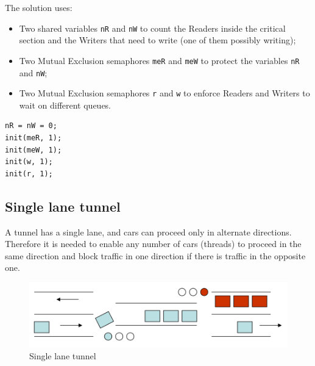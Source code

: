The solution uses:
\begin{itemize}
\item Two shared variables \texttt{nR} and \texttt{nW} to count the Readers inside the critical section and the Writers that need to write (one of them possibly writing);
\item Two Mutual Exclusion semaphores \texttt{meR} and \texttt{meW} to protect the variables \texttt{nR} and \texttt{nW};
\item Two Mutual Exclusion semaphores \texttt{r} and \texttt{w} to enforce Readers and Writers to wait on different queues.
\end{itemize}

\begin{verbatim}
nR = nW = 0;
init(meR, 1);
init(meW, 1);
init(w, 1);
init(r, 1);
\end{verbatim}

\begin{Parallel}{}{}
\end{Parallel}

\subsection{Single lane tunnel}
A tunnel has a single lane, and cars can proceed only in alternate directions. Therefore it is needed to enable any number of cars (threads) to proceed in the same direction and block traffic in one direction if there is traffic in the opposite one.

\begin{figure}[hbtp]
\centering
\includegraphics[scale=0.4]{images/synchronization/single_lane_tunnel.png}
\caption{Single lane tunnel}
\end{figure}



